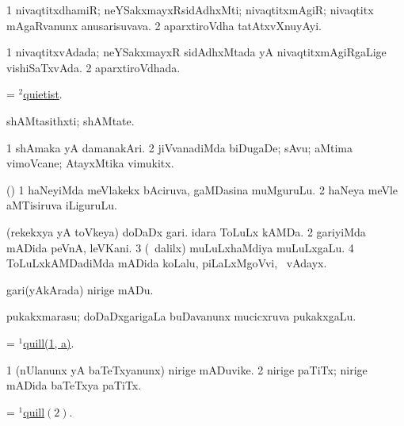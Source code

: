 \bentry
{}
\gl{\nA}
\bmng
\bnum
\num{1} nivaqtitxdhamiR; neYSakxmayxRsidAdhxMti; nivaqtitxmAgiR; nivaqtitx mAgaRvanunx anusarisuvava. 
\num{2} aparxtiroVdha tatAtxvXnuyAyi. 
\enum
\emng
\eentry

\bentry
{}
\gl{\gu}
\expl{}
\bmng
\bnum
\num{1} nivaqtitxvAdada; neYSakxmayxR sidAdhxMtada yA nivaqtitxmAgiRgaLige vishiSaTxvAda. 
\num{2} aparxtiroVdhada. 
\enum
\emng
\eentry

\bentry
{}
\gl{\gu}
\bmng
= \hyperlink{quietist(2)}{$^2$quietist}. 
\emng
\eentry

\bentry
{}
\gl{\nA}
\bmng
shAMtasithxti; shAMtate. 
\emng
\eentry

\bentry
{}
\gl{\nA}
\bmng
\bnum
\num{1} shAmaka yA damanakAri. 
\num{2} jiVvanadiMda biDugaDe; sAvu; aMtima vimoVcane; AtayxMtika vimukitx. 
\enum
\emng
\eentry

\bentry
{}
\gl{\nA}
\expl{}
\bmng
(\birx) 
\bnum
\num{1} haNeyiMda meVlakekx bAciruva, gaMDasina muMguruLu. 
\num{2} haNeya meVle aMTisiruva iLiguruLu. 
\enum
\emng
\eentry

\bentry
{}
\gl{\nA}
\bmng
\hypertarget{quill(1)1}{} 
\bnum
{} 
\banum
{} (rekekxya yA toVkeya) doDaDx gari. 
 idara ToLuLx kAMDa. 
\hypertarget{quill(1)2}{} 
\eanum
\numie
\num{2} gariyiMda mADida peVnA, leVKani. 
\num{3} (\sA\ \bava dalilx) muLuLxhaMdiya muLuLxgaLu. 
\num{4} ToLuLxkAMDadiMda mADida koLalu, piLaLxMgoVvi, \mo\ vAdayx. 
\enum
\emng
\eentry

\bentry
{}
\gl{\sakirx}
\bmng
gari(yAkArada) nirige mADu. 
\emng
\eentry

\bentry
{}
\gl{\nA}
\bmng
pukakxmarasu; doDaDxgarigaLa buDavanunx mucicxruva pukakxgaLu. 
\emng
\eentry

\bentry
{}
\gl{\nA}
\bmng
= \hyperlink{quill(1)1}{$^1$quill(1, a)}. 
\emng
\eentry

\bentry
{}
\gl{\nA}
\bmng
\bnum
\num{1} (nUlanunx yA baTeTxyanunx) nirige mADuvike. 
\num{2} nirige paTiTx; nirige mADida baTeTxya paTiTx. 
\enum
\emng
\eentry

\bentry
{}
\gl{\nA}
\bmng
= \hyperlink{quill(1)2}{$^1$quill\((2)\)}. 
\emng
\eentry

